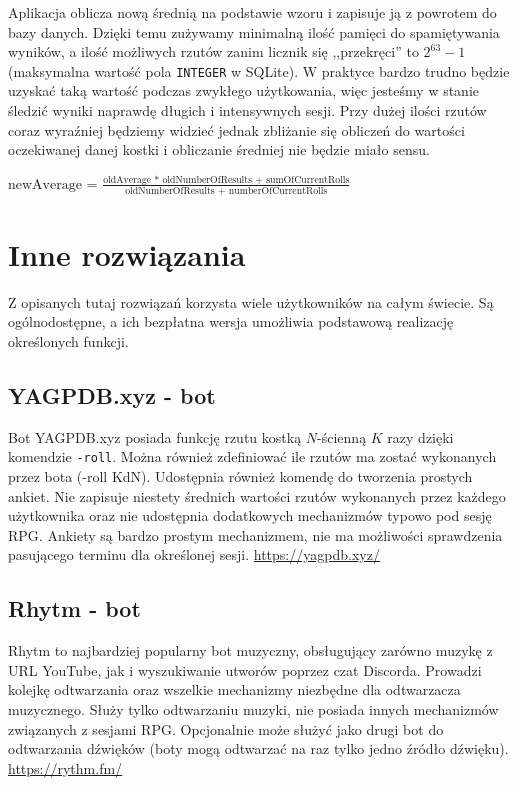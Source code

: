\documentclass[shortabstract,inz]{iithesis}
\begin{document}
			Aplikacja oblicza nową średnią na podstawie wzoru i zapisuje ją z powrotem do bazy danych. Dzięki temu zużywamy minimalną ilość pamięci do spamiętywania wyników, a ilość możliwych rzutów zanim licznik się ,,przekręci'' to \(2^{63} - 1\) (maksymalna wartość pola \texttt{INTEGER} w SQLite). W praktyce bardzo trudno będzie uzyskać taką wartość podczas zwykłego użytkowania, więc jesteśmy w stanie śledzić wyniki naprawdę długich i intensywnych sesji. Przy dużej ilości rzutów coraz wyraźniej będziemy widzieć jednak zbliżanie się obliczeń do wartości oczekiwanej danej kostki i obliczanie średniej nie będzie miało sensu.
			
			\begin{center}
				\(\textrm{newAverage = } \frac{\textrm{oldAverage * oldNumberOfResults + sumOfCurrentRolls}}{\textrm{oldNumberOfResults + numberOfCurrentRolls}}\)
			\end{center}		
		
	\chapter{Inne rozwiązania}	
		Z opisanych tutaj rozwiązań korzysta wiele użytkowników na całym świecie. Są ogólnodostępne, a ich bezpłatna wersja umożliwia podstawową realizację określonych funkcji. 
		\section{YAGPDB.xyz - bot}
		Bot YAGPDB.xyz posiada funkcję rzutu kostką \(N\)-ścienną \(K\) razy dzięki komendzie \texttt{-roll}. Można również zdefiniować ile rzutów ma zostać wykonanych przez bota (-roll KdN). Udostępnia również komendę do tworzenia prostych ankiet. Nie zapisuje niestety średnich wartości rzutów wykonanych przez każdego użytkownika oraz nie udostępnia dodatkowych mechanizmów typowo pod sesję RPG. Ankiety są bardzo prostym mechanizmem, nie ma możliwości sprawdzenia pasującego terminu dla określonej sesji. \url{https://yagpdb.xyz/}
		\section{Rhytm - bot}
		Rhytm to najbardziej popularny bot muzyczny, obsługujący zarówno muzykę z URL YouTube, jak i wyszukiwanie utworów poprzez czat Discorda. Prowadzi kolejkę odtwarzania oraz wszelkie mechanizmy niezbędne dla odtwarzacza muzycznego. Służy tylko odtwarzaniu muzyki, nie posiada innych mechanizmów związanych z sesjami RPG. Opcjonalnie może służyć jako drugi bot do odtwarzania dźwięków (boty mogą odtwarzać na raz tylko jedno źródło dźwięku). \url{https://rythm.fm/}
\end{document}
